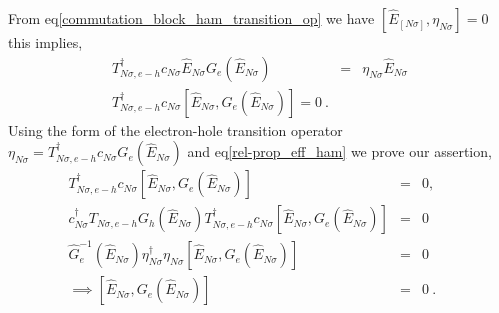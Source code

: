 \documentclass[12pt,a4paper]{article}
\begin{document}
\begin{itemize}
From eq\eqref{commutation_block_ham_transition_op} we have  $[\hat{E}_{[N\sigma]},\eta_{N\sigma}]=0$ this implies,
\begin{eqnarray}
T^{\dagger}_{N\sigma,e-h}c_{N\sigma}\hat{E}_{N\sigma}G_{e}(\hat{E}_{N\sigma}) &=& \eta_{N\sigma}\hat{E}_{N\sigma}\nonumber\\
T^{\dagger}_{N\sigma,e-h}c_{N\sigma}[\hat{E}_{N\sigma},G_{e}(\hat{E}_{N\sigma})]=0~.\label{rel-prop_eff_ham}
\end{eqnarray}
Using the form of the electron-hole transition operator $\eta_{N\sigma} =  T^{\dagger}_{N\sigma,e-h}c_{N\sigma}G_{e}(\hat{E}_{N\sigma})$ and eq\eqref{rel-prop_eff_ham} we prove our assertion, 
\begin{eqnarray}
T^{\dagger}_{N\sigma,e-h}c_{N\sigma}[\hat{E}_{N\sigma},G_{e}(\hat{E}_{N\sigma})] &=&0,\nonumber\\
c^{\dagger}_{N\sigma}T_{N\sigma,e-h}G_{h}(\hat{E}_{N\sigma})T^{\dagger}_{N\sigma,e-h}c_{N\sigma}[\hat{E}_{N\sigma},G_{e}(\hat{E}_{N\sigma})] &=&0\nonumber\\
\hat{G}^{-1}_{e}(\hat{E}_{N\sigma})\eta^{\dagger}_{N\sigma}\eta_{N\sigma}[\hat{E}_{N\sigma},G_{e}(\hat{E}_{N\sigma})] &=&0\nonumber\\
\implies [\hat{E}_{N\sigma},G_{e}(\hat{E}_{N\sigma})] &=& 0~.~~~~~\label{commutation of prop and eff ham}
\end{eqnarray}
\end{itemize}
\end{document}
